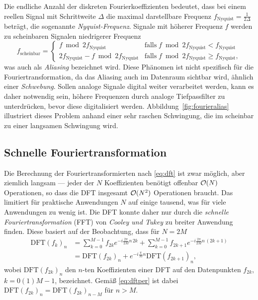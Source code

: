 Die endliche Anzahl der diskreten Fourierkoeffizienten bedeutet, dass
bei einem reellen Signal mit Schrittweite $\Delta$ die maximal
darstellbare Frequenz $f_\text{Nyquist}=\frac{1}{2\Delta}$ beträgt,
die sogenannte
\emph{Nyquist-Frequenz}. Signale mit höherer
Frequenz $f$ werden zu scheinbaren Signalen niedrigerer Frequenz
\begin{equation}
  f_\text{scheinbar} = \begin{cases}
    f \bmod 2 f_\text{Nyquist} & \text{falls}\; f \bmod 2 f_\text{Nyquist}
    < f_\text{Nyquist} \\
    2f_\text{Nyquist} - f \bmod 2 f_\text{Nyquist} & \text{falls}\; f \bmod 2 f_\text{Nyquist}
    \ge f_\text{Nyquist},
  \end{cases}
\end{equation}
was auch als \emph{Aliasing} bezeichnet wird.  Diese Phänomen ist
nicht spezifisch für die Fouriertransformation, da das Aliasing auch
im Datenraum sichtbar wird, ähnlich einer \emph{Schwebung}. Sollen
analoge Signale digital weiter verarbeitet werden, kann es daher
notwendig sein, höhere Frequenzen durch analoge Tiefpassfilter zu
unterdrücken, bevor diese digitalisiert
werden. Abbildung~\ref{fig:fourieralias} illustriert dieses Problem
anhand einer sehr raschen Schwingung, die im scheinbar zu einer
langsamen Schwingung wird.

\subsection{Schnelle Fouriertransformation}

Die Berechnung der Fouriertransformierten nach \eqref{eq:dft} ist zwar
möglich, aber ziemlich langsam --- jeder der $N$ Koeffizienten
benötigt offenbar $\mathcal O(N)$ Operationen, so dass die DFT insgesamt
$\mathcal O(N^2)$ Operationen braucht. Das limitiert für praktische
Anwendungen $N$ auf einige tausend, was für viele Anwendungen zu wenig
ist. Die DFT konnte daher nur durch die \emph{schnelle
  Fouriertransformation} (FFT) von \emph{Cooley und Tukey} zu breiter
Anwendung finden. Diese basiert auf der Beobachtung, dass für $N=2M$
\begin{align}
  \text{DFT}(f_k)_n &= \sum_{k=0}^{M-1} f_{2k} e^{-i\frac{2\pi}{2M} n\, 2k} +
  \sum_{k=0}^{M-1} f_{2k+1} e^{-i\frac{2\pi}{2M} n\, (2k + 1)}\\
  &= \text{DFT}(f_{2k})_n + e^{-i\frac{\pi}{M} n}
  \text{DFT}(f_{2k+1})_n,
\end{align}
wobei $\text{DFT}(f_{2k})_n$ den $n$-ten Koeffizienten einer DFT auf
den Datenpunkten $f_{2k}$, $k=0(1)M-1$, bezeichnet. Gemäß
\eqref{eq:dftper} ist dabei $\text{DFT}(f_{2k})_n =
\text{DFT}(f_{2k})_{n-M}$ für $n>M$.

